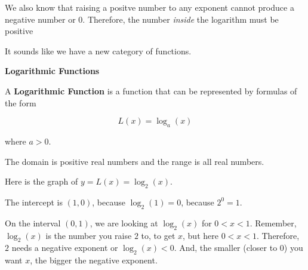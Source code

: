 \documentclass{ximera}
\begin{document}
We also know that raising a positve number to any exponent cannot produce a negative number or $0$.  Therefore, the number \textit{inside} the logarithm must be positive



It sounds like we have a new category of functions.




\begin{definition} \textbf{\textcolor{green!50!black}{Logarithmic Functions}}

A \textbf{Logarithmic Function} is a function that can be represented by formulas of the form

\[     L(x) =    \log_a(x)            \]

where $a > 0$.

The domain is positive real numbers and the range is all real numbers.

\end{definition}








\begin{example}

Here is the graph of $y = L(x) = \log_2(x)$.

\begin{image}
\end{image}


The intercept is $(1,0)$, because $\log_2(1) = 0$, because $2^0 = 1$.

On the interval $(0,1)$, we are looking at $\log_2(x)$ for $0<x<1$.  Remember, $\log_2(x)$ is the number you raise $2$ to, to get $x$, but here $0<x<1$.  Therefore, $2$ needs a negative exponent or $\log_2(x) < 0$.  And, the smaller (closer to $0$) you want $x$, the bigger the negative exponent.





\end{example}
\end{document}
